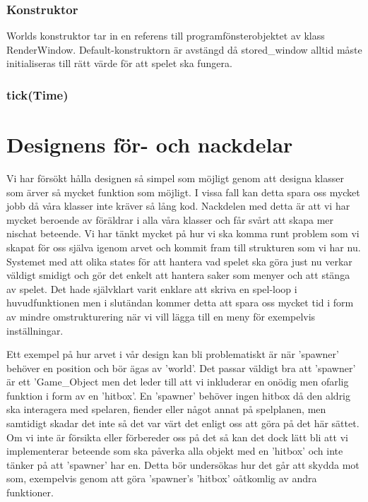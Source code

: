 \documentclass{TDP005mall}
\begin{document}
\subsubsection{Konstruktor}
Worlds konstruktor tar in en referens till programfönsterobjektet av klass RenderWindow. Default-konstruktorn är avstängd då stored\_window alltid måste initialiseras till rätt värde för att spelet ska fungera. 

\subsubsection{tick(Time)}



\section{Designens för- och nackdelar}
Vi har försökt hålla designen så simpel som möjligt genom att designa klasser som ärver så mycket funktion som möjligt. I vissa fall kan detta spara oss mycket jobb då våra klasser inte kräver så lång kod. Nackdelen med detta är att vi har mycket beroende av föräldrar i alla våra klasser och får svårt att skapa mer nischat beteende. Vi har tänkt mycket på hur vi ska komma runt problem som vi skapat för oss själva igenom arvet och kommit fram till strukturen som vi har nu. Systemet med att olika states för att hantera vad spelet ska göra just nu verkar väldigt smidigt och gör det enkelt att hantera saker som menyer och att stänga av spelet. Det hade självklart varit enklare att skriva en spel-loop i huvudfunktionen men i slutändan kommer detta att spara oss mycket tid i form av mindre omstrukturering när vi vill lägga till en meny för exempelvis inställningar.

Ett exempel på hur arvet i vår design kan bli problematiskt är när 'spawner' behöver en position och bör ägas av 'world'. Det passar väldigt bra att 'spawner' är ett 'Game\_Object men det leder till att vi inkluderar en onödig men ofarlig funktion i form av en 'hitbox'. En 'spawner' behöver ingen hitbox då den aldrig ska interagera med spelaren, fiender eller något annat på spelplanen, men samtidigt skadar det inte så det var värt det enligt oss att göra på det här sättet. Om vi inte är försikta eller förbereder oss på det så kan det dock lätt bli att vi implementerar beteende som ska påverka alla objekt med en 'hitbox' och inte tänker på att 'spawner' har en. Detta bör undersökas hur det går att skydda mot som, exempelvis genom att göra 'spawner's 'hitbox' oåtkomlig av andra funktioner.
\end{document}
